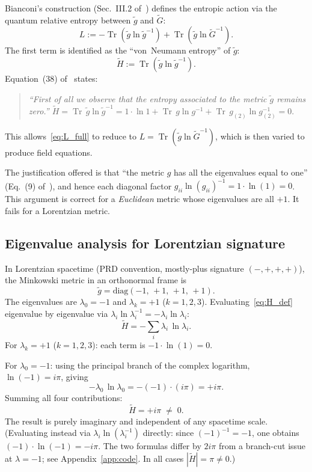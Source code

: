 \documentclass[aps,prd,twocolumn,preprintnumbers,superscriptaddress]{revtex4-2}
\newcommand{\tg}{\tilde{g}}
\newcommand{\tG}{\tilde{G}}
\newcommand{\tr}{\operatorname{Tr}}
\newcommand{\iunit}{i}
\begin{document}
Bianconi's construction (Sec.~III.2 of~\cite{Bianconi2025}) defines the
entropic action via the quantum relative entropy between $\tg$ and $\tG$:
\begin{equation}
  L := -\tr(\tg\ln\tg^{-1}) + \tr(\tg\ln\tG^{-1}).
  \label{eq:L_full}
\end{equation}
The first term is identified as the ``von~Neumann entropy'' of $\tg$:
\begin{equation}
  \tilde{H} := \tr(\tg\ln\tg^{-1}).
  \label{eq:H_def}
\end{equation}
Equation~(38) of~\cite{Bianconi2025} states:
\begin{quote}\itshape
``First of all we observe that the entropy associated to the metric $\tg$
remains zero.''
\qquad $\tilde{H} = \tr\,\tg\ln\tg^{-1} = 1\cdot\ln 1 +
\tr\,g\ln g^{-1} + \tr\,g_{(2)}\ln g_{(2)}^{-1} = 0.$
\end{quote}
This allows~\eqref{eq:L_full} to reduce to $L = \tr(\tg\ln\tG^{-1})$,
which is then varied to produce field equations.

The justification offered is that ``the metric $g$ has all the eigenvalues
equal to one'' (Eq.~(9) of~\cite{Bianconi2025}), and hence each diagonal
factor $g_{ii}\ln(g_{ii})^{-1} = 1\cdot\ln(1) = 0$.
This argument is correct for a \emph{Euclidean} metric whose eigenvalues
are all $+1$.  It fails for a Lorentzian metric.

\subsection{Eigenvalue analysis for Lorentzian signature}

In Lorentzian spacetime (PRD convention, mostly-plus signature
$(-,+,+,+)$), the Minkowski metric in an orthonormal frame is
\begin{equation}
  \tg = \mathrm{diag}(-1,\,+1,\,+1,\,+1).
  \label{eq:mink}
\end{equation}
The eigenvalues are $\lambda_0 = -1$ and $\lambda_k = +1$ ($k=1,2,3$).
Evaluating~\eqref{eq:H_def} eigenvalue by eigenvalue via
$\lambda_i\ln\lambda_i^{-1} = -\lambda_i\ln\lambda_i$:
\begin{equation}
  \tilde{H} = -\sum_{i} \lambda_i\,\ln\lambda_i.
  \label{eq:H_sum}
\end{equation}
For $\lambda_k = +1$ ($k=1,2,3$): each term is $-1\cdot\ln(1) = 0$.

For $\lambda_0 = -1$: using the principal branch of the complex logarithm,
$\ln(-1) = \iunit\pi$, giving
\begin{equation}
  -\lambda_0\,\ln\lambda_0
  = -(-1)\cdot(\iunit\pi)
  = +\iunit\pi.
  \label{eq:neg_contrib}
\end{equation}
Summing all four contributions:
\begin{equation}
  \boxed{\tilde{H} = +\iunit\pi \;\neq\; 0.}
  \label{eq:H_result}
\end{equation}
The result is purely imaginary and independent of any spacetime scale.
(Evaluating instead via $\lambda_i\ln(\lambda_i^{-1})$ directly: since
$(-1)^{-1}=-1$, one obtains $(-1)\cdot\ln(-1)=-\iunit\pi$.  The two
formulas differ by $2\iunit\pi$ from a branch-cut issue at $\lambda=-1$;
see Appendix~\ref{app:code}.  In all cases $|\tilde{H}|=\pi\neq 0$.)
\end{document}
